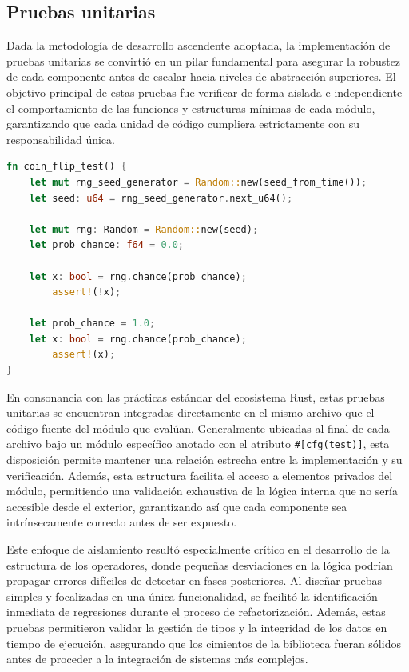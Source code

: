 \documentclass[12pt,a4paper,twoside,openright]{book}
\begin{document}
        \subsection{Pruebas unitarias}
            Dada la metodología de desarrollo ascendente adoptada, la implementación de pruebas unitarias se convirtió en un pilar fundamental para asegurar la robustez de cada componente antes de escalar hacia niveles de abstracción superiores. El objetivo principal de estas pruebas fue verificar de forma aislada e independiente el comportamiento de las funciones y estructuras mínimas de cada módulo, garantizando que cada unidad de código cumpliera estrictamente con su responsabilidad única. 

    \noindent
    \begin{samepage}
    \begin{lstlisting}[language=Rust, caption={Ejemplo de una prueba unitaria sobre el modulo de generación de números pseudoaleatorios.}, label={lst:coinflip_test}]
fn coin_flip_test() {
    let mut rng_seed_generator = Random::new(seed_from_time());
    let seed: u64 = rng_seed_generator.next_u64();

    let mut rng: Random = Random::new(seed);
    let prob_chance: f64 = 0.0;

    let x: bool = rng.chance(prob_chance);
        assert!(!x);

    let prob_chance = 1.0;
    let x: bool = rng.chance(prob_chance);
        assert!(x);
}
    \end{lstlisting}    
    \end{samepage}

            En consonancia con las prácticas estándar del ecosistema Rust, estas pruebas unitarias se encuentran integradas directamente en el mismo archivo que el código fuente del módulo que evalúan. Generalmente ubicadas al final de cada archivo bajo un módulo específico anotado con el atributo \texttt{\#[cfg(test)]}, esta disposición permite mantener una relación estrecha entre la implementación y su verificación. Además, esta estructura facilita el acceso a elementos privados del módulo, permitiendo una validación exhaustiva de la lógica interna que no sería accesible desde el exterior, garantizando así que cada componente sea intrínsecamente correcto antes de ser expuesto.

            Este enfoque de aislamiento resultó especialmente crítico en el desarrollo de la estructura de los operadores, donde pequeñas desviaciones en la lógica podrían propagar errores difíciles de detectar en fases posteriores. Al diseñar pruebas simples y focalizadas en una única funcionalidad, se facilitó la identificación inmediata de regresiones durante el proceso de refactorización. Además, estas pruebas permitieron validar la gestión de tipos y la integridad de los datos en tiempo de ejecución, asegurando que los cimientos de la biblioteca fueran sólidos antes de proceder a la integración de sistemas más complejos.
\end{document}
